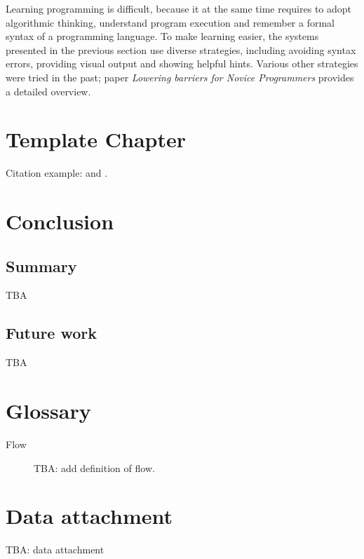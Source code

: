 \documentclass[
    digital,    %
    oneside,    %
    color,
    11pt,
    nocover,
    notable,
    nolof,
    nolot,
    final
]{fithesis3}
\begin{document}
Learning programming is difficult,
  because it at the same time requires
  to adopt algorithmic thinking,
  understand program execution
  and remember a formal syntax of a programming language.
To make learning easier,
  the systems presented in the previous section use diverse strategies,
  including avoiding syntax errors,
  providing visual output
  and showing helpful hints.
Various other strategies were tried in the past;
paper \emph{Lowering barriers for Novice Programmers}
  \cite{lowering-barriers}
  provides a detailed overview.



\chapter{Template Chapter}
\label{chap:template}

Citation example: \cite{adaptive-practice} and \cite{flow}.


\chapter{Conclusion}
\label{chap:conclusion}

\section{Summary}
\label{sec:conclusion.summary}

TBA

\section{Future work}
\label{sec:conclusion.future-work}

TBA



\printbibliography[heading=bibintoc]

\appendix

\chapter{Glossary}
\label{chap:glossary}

\begin{description}
    \item[Flow] TBA: add definition of flow.
\end{description}

\chapter{Data attachment}
\label{chap:data}

TBA: data attachment
\end{document}
